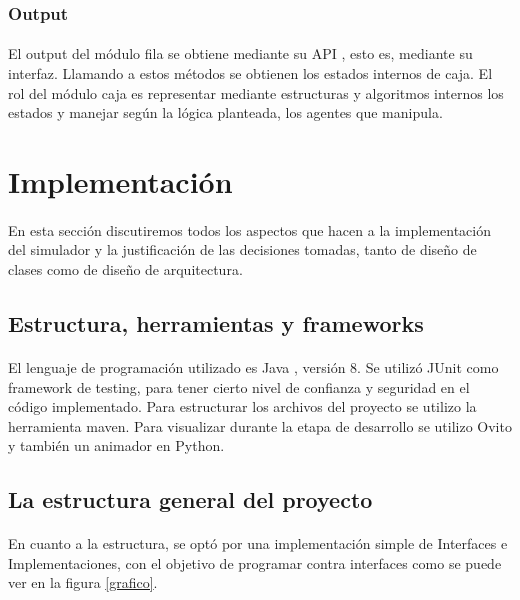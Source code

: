\documentclass{article}
\begin{document}
\subsubsection{Output}

\paragraph{}
El output del módulo fila se obtiene mediante su API , esto es, mediante su interfaz. Llamando a estos métodos se obtienen los estados internos de caja. El rol del módulo caja es representar mediante estructuras y algoritmos internos los estados y manejar según la lógica planteada, los agentes que manipula.


\section{Implementación}

\paragraph{}
En esta sección discutiremos todos los aspectos que hacen a la implementación del simulador y la justificación de las decisiones tomadas, tanto de diseño de clases como de diseño de arquitectura.

\subsection{Estructura, herramientas y frameworks}

\paragraph{}
El lenguaje de programación utilizado es Java , versión 8. Se utilizó JUnit como framework de testing, para tener cierto nivel de confianza y seguridad en el código implementado. Para estructurar los archivos del proyecto se utilizo la herramienta maven. Para visualizar durante la etapa de desarrollo se utilizo Ovito y también un animador en Python.

\subsection{La estructura general del proyecto}

\paragraph{}
En cuanto a la estructura, se optó por una implementación simple de Interfaces e Implementaciones, con el objetivo de programar contra interfaces como se puede ver en la figura \ref{grafico}. 
\end{document}
